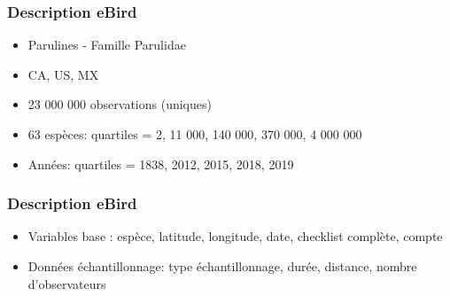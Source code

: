 \documentclass[10pt]{beamer}
\begin{document}
\begin{frame}
  \frametitle{Description eBird}
  \begin{itemize}
    \item Parulines - Famille Parulidae
    \item CA, US, MX
    \item 23 000 000 observations (uniques)
    \item 63 espèces: quartiles = 2, 11 000, 140 000, 370 000, 4 000 000
    \item Années: quartiles = 1838, 2012, 2015, 2018, 2019
  \end{itemize}
\end{frame}

\begin{frame}
  \frametitle{Description eBird}
  \begin{itemize}
    \item Variables base : espèce, latitude, longitude, date, checklist complète, compte
  \end{itemize}
  \begin{itemize}
    \item Données échantillonnage: type échantillonnage, durée, distance, nombre d'observateurs
  \end{itemize}
\end{frame}
\end{document}
